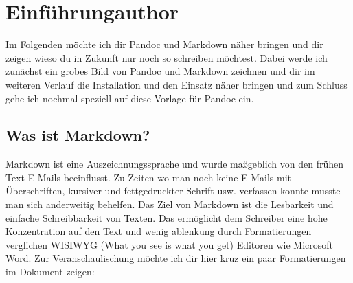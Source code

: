 \documentclass[
    12pt,
    a4paper,
            ngerman,
        bibliography=totocnumbered,
    listof=totocnumbered
]{scrartcl}
\begin{document}
\renewcommand{\sectionmark}[1]{\markright{#1}}
\renewcommand{\subsectionmark}[1]{}
\renewcommand{\subsubsectionmark}[1]{}
\rhead{} %

\onehalfspacing
\renewcommand{\thesection}{\arabic{section}}
\renewcommand{\theHsection}{\arabic{section}}
\setcounter{section}{0}
\setcounter{page}{1}



\hypertarget{einfuxfchrungauthor}{%
\section{Einführungauthor}\label{einfuxfchrungauthor}}

Im Folgenden möchte ich dir Pandoc und Markdown näher bringen und dir
zeigen wieso du in Zukunft nur noch so schreiben möchtest. Dabei werde
ich zunächst ein grobes Bild von Pandoc und Markdown zeichnen und dir im
weiteren Verlauf die Installation und den Einsatz näher bringen und zum
Schluss gehe ich nochmal speziell auf diese Vorlage für Pandoc ein.

\hypertarget{was-ist-markdown}{%
\subsection{Was ist Markdown?}\label{was-ist-markdown}}

Markdown ist eine Auszeichnungssprache und wurde maßgeblich von den
frühen Text-E-Mails beeinflusst. Zu Zeiten wo man noch keine E-Mails mit
Überschriften, kursiver und fettgedruckter Schrift usw. verfassen konnte
musste man sich anderweitig behelfen. Das Ziel von Markdown ist die
Lesbarkeit und einfache Schreibbarkeit von Texten. Das ermöglicht dem
Schreiber eine hohe Konzentration auf den Text und wenig ablenkung durch
Formatierungen verglichen WISIWYG (What you see is what you get)
Editoren wie Microsoft Word. Zur Veranschaulischung möchte ich dir hier
kruz ein paar Formatierungen im Dokument zeigen:
\end{document}
